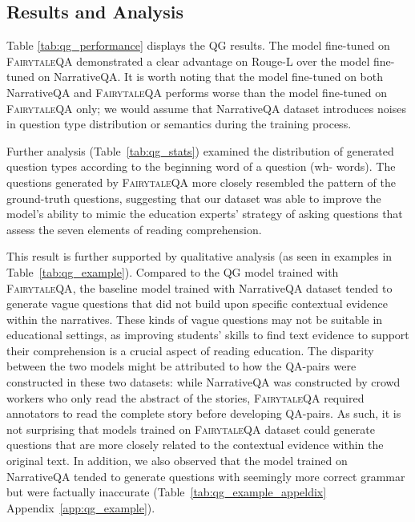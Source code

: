 \documentclass[11pt]{article}
\newcommand{\datasetname}{\textsc{FairytaleQA}\xspace}
\begin{document}
\subsection{Results and Analysis}


Table \ref{tab:qg_performance} displays the QG results. 
The model fine-tuned on \datasetname demonstrated a clear advantage on Rouge-L over the model fine-tuned on NarrativeQA. It is worth noting that the model fine-tuned on both NarrativeQA and \datasetname performs worse than the model fine-tuned on \datasetname only; we would assume that NarrativeQA dataset introduces noises in question type distribution or semantics during the training process.

Further analysis (Table~\ref{tab:qg_stats}) examined the distribution of generated question types according to the beginning word of a question (wh- words). The questions generated by \datasetname more closely resembled the pattern of the ground-truth questions, suggesting that our dataset was able to improve the model's ability to mimic the education experts' strategy of asking questions that assess the seven elements of reading comprehension.

This result is further supported by qualitative analysis (as seen in examples in Table~\ref{tab:qg_example}). Compared to the QG model trained with \datasetname, the baseline model trained with NarrativeQA dataset tended to generate vague questions that did not build upon specific contextual evidence within the narratives. These kinds of vague questions may not be suitable in educational settings, as improving students' skills to find text evidence to support their comprehension is a crucial aspect of reading education. The disparity between the two models might be attributed to how the QA-pairs were constructed in these two datasets: while NarrativeQA was constructed by crowd workers who only read the abstract of the stories, \datasetname required annotators to read the complete story before developing QA-pairs. As such, it is not surprising that models trained on \datasetname dataset could generate questions that are more closely related to the contextual evidence within the original text. In addition, we also observed that the model trained on NarrativeQA tended to generate questions with seemingly more correct grammar but were factually inaccurate (Table~\ref{tab:qg_example_appeldix} Appendix~\ref{app:qg_example}).
\end{document}
